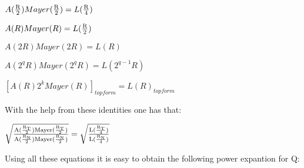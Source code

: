 \documentclass[a4paper,a4paper]{article}
\begin{document}
\begin{center}
 
{  $A(\frac{\rm R}{\rm 2})Mayer(\frac{\rm R}{\rm 2}) 
 = L(\frac{\rm R}{\rm 4})$}
\end{center} 
\begin{center}
 
{  $A(R)Mayer(R) 
 = L(\frac{\rm R}{\rm 2})$}
\end{center} 
\begin{center}
 
{  $A(2R)Mayer(2R) 
 = L(R)$}
\end{center}
\begin{center}
{  $A(2^qR)Mayer(2^qR) 
 = L(2^{q-1}R)$}
\end{center} 
\begin{center}
 
{  $[A(R)2^kMayer(R)]_{top form} 
 = L(R)_{top form}$}
\end{center}

With the help from these identities one has that:
\begin{center}
{  $ \sqrt{\frac{\rm A(\frac{\rm R_T}{\rm 2})Mayer(\frac{\rm R_T}{\rm 2})}{\rm A(\frac{\rm R_N}{\rm 2})Mayer(\frac{\rm R_N}{\rm 2})}}
 = \sqrt{\frac{\rm L(\frac{\rm R_T}{\rm 4})}{\rm L(\frac{\rm R_N}{\rm 4})}}$}

 

\end{center}
Using all these equations it is easy to obtain the following power expantion for Q:
 
\end{document}
